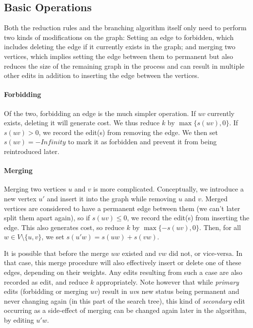 \documentclass{article}
\theoremstyle{definition}
\begin{document}
\subsection{Basic Operations}

Both the reduction rules and the branching algorithm itself only need to perform two kinds of
modifications on the graph: Setting an edge to forbidden, which includes deleting the edge if it
currently exists in the graph; and merging two vertices, which implies setting the edge between them
to permanent but also reduces the size of the remaining graph in the process and can result in
multiple other edits in addition to inserting the edge between the vertices.


\paragraph{Forbidding} Of the two, forbidding an edge is the much simpler operation. If $uv$
currently exists, deleting it will generate cost. We thus reduce $k$ by $\max\{s(uv), 0\}$. If $s(uv)
> 0$, we record the edit(s) from removing the edge. We then set $s(uv) = -Infinity$ to mark it as
forbidden and prevent it from being reintroduced later.

\paragraph{Merging} \label{sec:merging} Merging two vertices $u$ and $v$ is more complicated. Conceptually, we introduce
a new vertex $u'$ and insert it into the graph while removing $u$ and $v$. Merged vertices are
considered to have a permanent edge between them (we can't later split them apart again), so if
$s(uv) \leq 0$, we record the edit(s) from inserting the edge. This also generates cost, so reduce
$k$ by $\max\{-s(uv), 0\}$. Then, for all $w \in V \setminus \{u, v\}$, we set $s(u'w) = s(uw) +
s(vw)$.

It is possible that before the merge $uw$ existed and $vw$ did not, or vice-versa. In that case,
this merge procedure will also effectively insert or delete one of these edges, depending on their
weights. Any edits resulting from such a case are also recorded as edit, and reduce $k$
appropriately. Note however that while \emph{primary} edits (forbidding or merging $uv$) result in
$uv$s new status being permanent and never changing again (in this part of the search tree), this
kind of \emph{secondary} edit occurring as a side-effect of merging can be changed again later in
the algorithm, by editing $u'w$.
\end{document}
